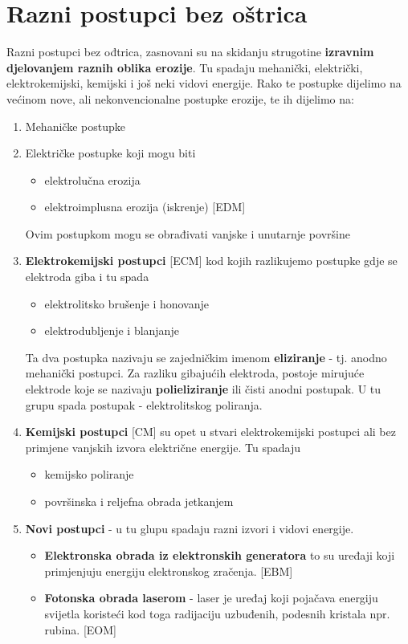 \documentclass[a4paper,12pt]{article}
\numberwithin{figure}{section}
\begin{document}
\section{Razni postupci bez oštrica}
Razni postupci bez ođtrica, zasnovani su na skidanju strugotine \textbf{izravnim djelovanjem raznih oblika erozije}. Tu spadaju mehanički, električki, elektrokemijski, kemijski i još neki vidovi energije. Rako te postupke dijelimo na većinom nove, ali nekonvencionalne postupke erozije, te ih dijelimo na:
\begin{enumerate}
\item Mehaničke postupke
\item Električke postupke koji mogu biti 
\begin{itemize}
\item elektrolučna erozija
\item elektroimplusna erozija (iskrenje) [EDM]
\end{itemize}
Ovim postupkom mogu se obrađivati vanjske i unutarnje površine
\item \textbf{Elektrokemijski postupci} [ECM] kod kojih razlikujemo postupke gdje se elektroda giba i tu spada
\begin{itemize}
\item elektrolitsko brušenje i honovanje
\item elektrodubljenje i blanjanje
\end{itemize}
Ta dva postupka nazivaju se zajedničkim imenom \textbf{eliziranje} - tj. anodno mehanički postupci. Za razliku gibajućih elektroda, postoje mirujuće elektrode koje se nazivaju \textbf{polieliziranje} ili čisti anodni postupak. U tu grupu spada postupak - elektrolitskog poliranja.
\item \textbf{Kemijski postupci} [CM] su opet u stvari elektrokemijski postupci ali bez primjene vanjskih izvora električne energije. Tu spadaju
\begin{itemize}
\item kemijsko poliranje
\item površinska i reljefna obrada jetkanjem
\end{itemize}
\item \textbf{Novi postupci} - u tu glupu spadaju razni izvori i vidovi energije.
\begin{itemize}
\item \textbf{Elektronska obrada iz elektronskih generatora} to su uređaji koji primjenjuju energiju elektronskog zračenja. [EBM]
\item \textbf{Fotonska obrada laserom} - laser je uređaj koji pojačava energiju svijetla koristeći kod toga radijaciju uzbuđenih, podesnih kristala npr. rubina. [EOM]

\end{itemize}
\end{enumerate}
\end{document}
